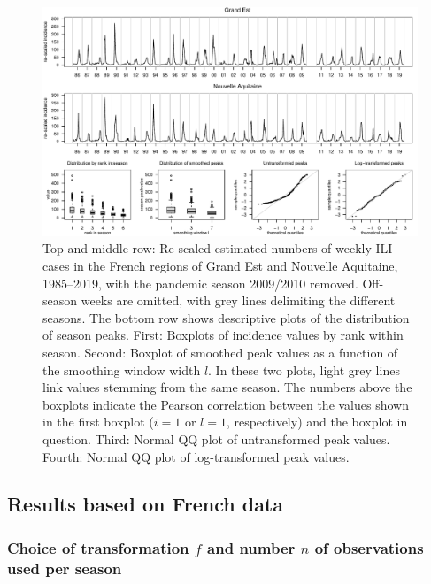 \documentclass[12pt]{article}
\begin{document}

\begin{figure}[h]
\center
\includegraphics[width=1\textwidth]{figure/plot_data_fr.pdf}
\caption{Top and middle row: Re-scaled estimated numbers of weekly ILI cases in the French regions of Grand Est and Nouvelle Aquitaine, 1985--2019, with the pandemic season 2009/2010 removed. Off-season weeks are omitted, with grey lines delimiting the different seasons. The bottom row shows descriptive plots of the distribution of season peaks. First: Boxplots of incidence values by rank within season. Second: Boxplot of smoothed peak values as a function of the smoothing window width $l$. In these two plots, light grey lines link values stemming from the same season. The numbers above the boxplots indicate the Pearson correlation between the values shown in the first boxplot ($i = 1$ or $l = 1$, respectively) and the boxplot in question. Third: Normal QQ plot of untransformed peak values. Fourth: Normal QQ plot of log-transformed peak values.}
\label{fig:data}
\end{figure}

\subsection{Results based on French data}

\subsubsection{Choice of transformation $f$ and number $n$ of observations used per season}
\label{subsubsec:n}
\end{document}
